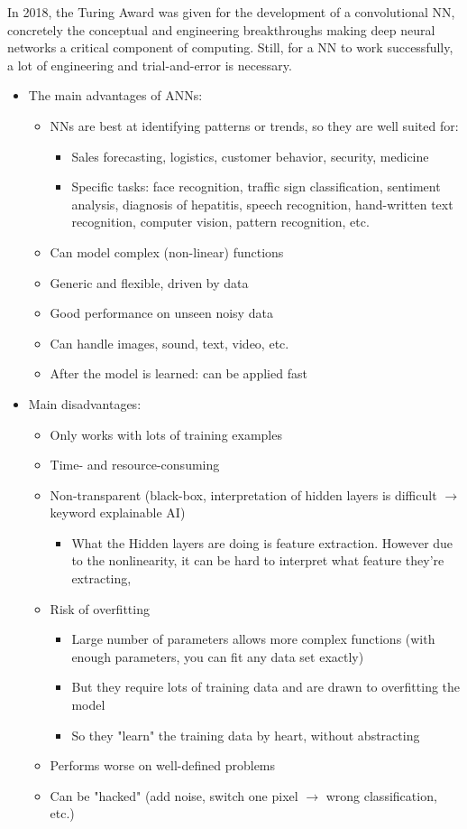 In 2018, the Turing Award was given for the development of a convolutional NN, concretely the conceptual and engineering breakthroughs making deep neural networks a critical component of computing. Still, for a NN to work successfully, a lot of engineering and trial-and-error is necessary.
\begin{itemize}
  \item The main advantages of ANNs:
  \begin{itemize}
    \item NNs are best at identifying patterns or trends, so they are well suited for:
    \begin{itemize}
      \item Sales forecasting, logistics, customer behavior, security, medicine
      \item Specific tasks: face recognition, traffic sign classification, sentiment analysis, diagnosis of hepatitis, speech recognition, hand-written text recognition, computer vision, pattern recognition, etc.
    \end{itemize}
    \item Can model complex (non-linear) functions
    \item Generic and flexible, driven by data
    \item Good performance on unseen noisy data
    \item Can handle images, sound, text, video, etc.
    \item After the model is learned: can be applied fast
  \end{itemize}
  \item Main disadvantages:
  \begin{itemize}
    \item Only works with lots of training examples
    \item Time- and resource-consuming
    \item Non-transparent (black-box, interpretation of hidden layers is difficult $\rightarrow$ keyword explainable AI)
    \begin{itemize}
      \item What the Hidden layers are doing is feature extraction. However due to the nonlinearity, it can be hard to interpret what feature they're extracting,
    \end{itemize}
    \item Risk of overfitting
    \begin{itemize}
      \item Large number of parameters allows more complex functions (with enough parameters, you can fit any data set exactly)
      \item But they require lots of training data and are drawn to overfitting the model
      \item So they "learn" the training data by heart, without abstracting
    \end{itemize}
    \item Performs worse on well-defined problems
    \item Can be "hacked" (add noise, switch one pixel $\rightarrow$ wrong classification, etc.)
  \end{itemize}
\end{itemize}
